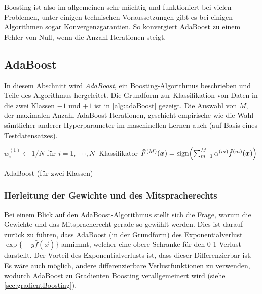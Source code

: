 		Boosting ist also im allgemeinen sehr mächtig und funktioniert bei vielen Problemen, unter einigen technischen Voraussetzungen gibt es bei einigen Algorithmen sogar Konvergenzgarantien. So konvergiert \bspw AdaBoost zu einem Fehler von Null, wenn die Anzahl Iterationen steigt.

		\subsection{AdaBoost}
			In diesem Abschnitt wird \emph{AdaBoost}, ein Boosting-Algorithmus beschrieben und Teile des Algorithmus hergeleitet. Die Grundform zur Klassifikation von Daten in die zwei Klassen \( -1 \) und \( +1 \) ist in \autoref{alg:adaBoost} gezeigt. Die Auswahl von \(M\), der maximalen Anzahl AdaBoost-Iterationen, geschieht empirische wie die Wahl sämtlicher anderer Hyperparameter im maschinellen Lernen auch (\zB auf Basis eines Testdatensatzes).

			\begin{algorithm}  \DontPrintSemicolon
				\( w_i^{(1)} \gets 1/N \) für \( i = 1,\,\cdots\!,N \) \;
				\Return Klassifikator \( \hat{F}^{(M)}(\bm{x}) = \operatorname{sign}\!\Big(\! \sum_{m = 1}^{M} \alpha^{(m)} \hat{f}^{(m)}(\bm{x}) \Big) \) \;
				\caption{AdaBoost (für zwei Klassen)}
				\label{alg:adaBoost}
			\end{algorithm}

			\subsubsection{Herleitung der Gewichte und des Mitspracherechts}
				Bei einem Blick auf den AdaBoost-Algorithmus stellt sich die Frage, warum die Gewichte und das Mitspracherecht gerade so gewählt werden. Dies ist darauf zurück zu führen, dass AdaBoost (in der Grundform) des Exponentialverlust \( \exp\big\{ -y \hat{f}(\vec{x}) \big\} \) annimmt, welcher eine obere Schranke für den 0-1-Verlust darstellt. Der Vorteil des Exponentialverlusts ist, dass dieser Differenzierbar ist. Es wäre auch möglich, andere differenzierbare Verlustfunktionen zu verwenden, wodurch AdaBoost zu Gradienten Boosting verallgemeinert wird (siehe \autoref{sec:gradientBoosting}).

